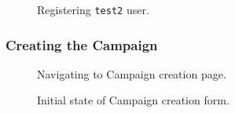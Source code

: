 \documentclass{article}
\begin{document}
		\begin{figure}[H]
			\centering
			\caption{Registering \texttt{test2} user.}
			\label{fig:eval-prep-4}
		\end{figure}

		\FloatBarrier
		\subsubsection{Creating the Campaign}

		\begin{figure}[H]
			\centering
			\caption{Navigating to Campaign creation page.}
			\label{fig:eval-ca-1}
		\end{figure}

		\begin{figure}[H]
			\centering
			\caption{Initial state of Campaign creation form.}
			\label{fig:eval-ca-2}
		\end{figure}
\end{document}

